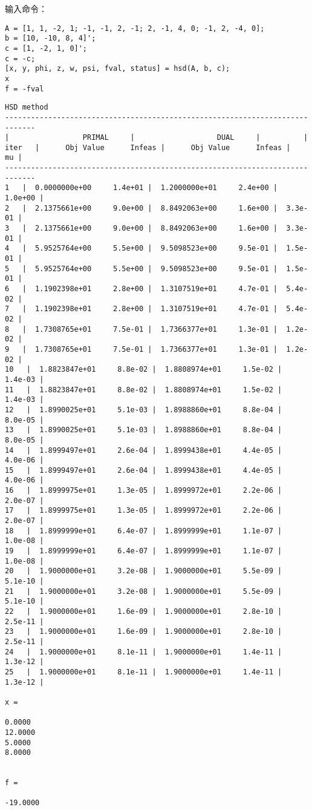 \documentclass{ctexart}
\numberwithin{equation}{section} %
\begin{document}
输入命令：
\begin{verbatim}
A = [1, 1, -2, 1; -1, -1, 2, -1; 2, -1, 4, 0; -1, 2, -4, 0];
b = [10, -10, 8, 4]';
c = [1, -2, 1, 0]';
c = -c;
[x, y, phi, z, w, psi, fval, status] = hsd(A, b, c);
x
f = -fval
\end{verbatim}
\color{lightgray} 
\begin{verbatim}
HSD method
-----------------------------------------------------------------------------
|                 PRIMAL     |                   DUAL     |          |
iter   |      Obj Value      Infeas |      Obj Value      Infeas |       mu |
-----------------------------------------------------------------------------
1   |  0.0000000e+00     1.4e+01 |  1.2000000e+01     2.4e+00 |  1.0e+00 |
2   |  2.1375661e+00     9.0e+00 |  8.8492063e+00     1.6e+00 |  3.3e-01 |
3   |  2.1375661e+00     9.0e+00 |  8.8492063e+00     1.6e+00 |  3.3e-01 |
4   |  5.9525764e+00     5.5e+00 |  9.5098523e+00     9.5e-01 |  1.5e-01 |
5   |  5.9525764e+00     5.5e+00 |  9.5098523e+00     9.5e-01 |  1.5e-01 |
6   |  1.1902398e+01     2.8e+00 |  1.3107519e+01     4.7e-01 |  5.4e-02 |
7   |  1.1902398e+01     2.8e+00 |  1.3107519e+01     4.7e-01 |  5.4e-02 |
8   |  1.7308765e+01     7.5e-01 |  1.7366377e+01     1.3e-01 |  1.2e-02 |
9   |  1.7308765e+01     7.5e-01 |  1.7366377e+01     1.3e-01 |  1.2e-02 |
10   |  1.8823847e+01     8.8e-02 |  1.8808974e+01     1.5e-02 |  1.4e-03 |
11   |  1.8823847e+01     8.8e-02 |  1.8808974e+01     1.5e-02 |  1.4e-03 |
12   |  1.8990025e+01     5.1e-03 |  1.8988860e+01     8.8e-04 |  8.0e-05 |
13   |  1.8990025e+01     5.1e-03 |  1.8988860e+01     8.8e-04 |  8.0e-05 |
14   |  1.8999497e+01     2.6e-04 |  1.8999438e+01     4.4e-05 |  4.0e-06 |
15   |  1.8999497e+01     2.6e-04 |  1.8999438e+01     4.4e-05 |  4.0e-06 |
16   |  1.8999975e+01     1.3e-05 |  1.8999972e+01     2.2e-06 |  2.0e-07 |
17   |  1.8999975e+01     1.3e-05 |  1.8999972e+01     2.2e-06 |  2.0e-07 |
18   |  1.8999999e+01     6.4e-07 |  1.8999999e+01     1.1e-07 |  1.0e-08 |
19   |  1.8999999e+01     6.4e-07 |  1.8999999e+01     1.1e-07 |  1.0e-08 |
20   |  1.9000000e+01     3.2e-08 |  1.9000000e+01     5.5e-09 |  5.1e-10 |
21   |  1.9000000e+01     3.2e-08 |  1.9000000e+01     5.5e-09 |  5.1e-10 |
22   |  1.9000000e+01     1.6e-09 |  1.9000000e+01     2.8e-10 |  2.5e-11 |
23   |  1.9000000e+01     1.6e-09 |  1.9000000e+01     2.8e-10 |  2.5e-11 |
24   |  1.9000000e+01     8.1e-11 |  1.9000000e+01     1.4e-11 |  1.3e-12 |
25   |  1.9000000e+01     8.1e-11 |  1.9000000e+01     1.4e-11 |  1.3e-12 |

x =

0.0000
12.0000
5.0000
8.0000


f =

-19.0000

\end{verbatim} \color{black}
\end{document}
